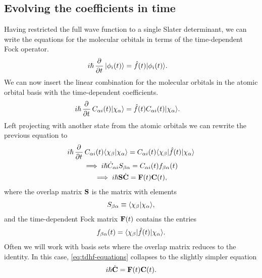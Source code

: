     \subsection{Evolving the coefficients in time}
        Having restricted the full wave function to a single Slater determinant,
        we can write the equations for the molecular orbitals in terms of the
        time-dependent Fock operator.
        \begin{align}
            i\hslash\dpd{}{t}\ket{\phi_i(t)}
            &= \hat{f}(t)\ket{\phi_i(t)}.
        \end{align}
        We can now insert the linear combination for the molecular orbitals in
        the atomic orbital basis with the time-dependent coefficients.
        \begin{align}
            i\hslash\dpd{}{t}C_{\alpha i}(t)\ket{\chi_{\alpha}}
            &= \hat{f}(t)C_{\alpha i}(t)\ket{\chi_{\alpha}}.
        \end{align}
        Left projecting with another state from the atomic orbitals we can rewrite
        the previous equation to
        \begin{gather}
            i\hslash\dpd{}{t}C_{\alpha i}(t)\braket{\chi_{\beta}}{\chi_{\alpha}}
            =
            C_{\alpha i}(t)\bra{\chi_{\beta}}\hat{f}(t)\ket{\chi_{\alpha}}
            \\
            \implies
            i\hslash \dot{C}_{\alpha i} S_{\beta\alpha}
            = C_{\alpha i}(t)f_{\beta\alpha}(t)
            \\
            \implies
            i\hslash \vf{S}\dot{\vf{C}}
            = \vf{F}(t)\vf{C}(t),
            \label{eq:tdhf-equations}
        \end{gather}
        where the overlap matrix $\mathbf{S}$ is the matrix with elements
        \begin{align}
            S_{\beta\alpha} \equiv \langle \chi_{\beta} | \chi_{\alpha} \rangle,
            \label{eq:overlap_ao}
        \end{align}
        and the time-dependent Fock matrix $\mathbf{F}(t)$ contains the entries
        \begin{align}
            f_{\beta\alpha}(t) = \langle \chi_{\beta} |\hat{f}(t)| \chi_\alpha \rangle.
        \end{align}
        Often we will work with basis sets where the overlap matrix reduces to
        the identity. In this case, \autoref{eq:tdhf-equations} collapses to the
        slightly simpler equation
        \begin{align}
            i\hslash \dot{\mathbf{C}} = \mathbf{F}(t)\mathbf{C}(t).
            \label{eq:tdhf-orthogonal}
        \end{align}

